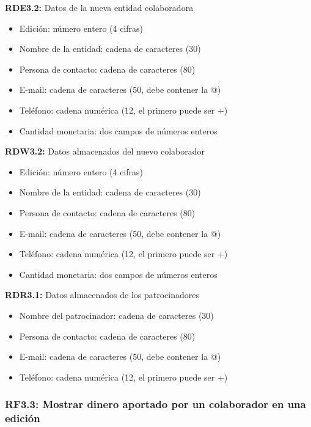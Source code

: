 \textbf{RDE3.2:} Datos de la nueva entidad colaboradora
\begin{itemize}
	\item Edición: número entero (4 cifras)
\newline
	\item Nombre de la entidad: cadena de caracteres (30)
	\item Persona de contacto: cadena de caracteres (80)
	\item E-mail: cadena de caracteres (50, debe contener la @)
	\item Teléfono: cadena numérica (12, el primero puede ser +)
\newline
	\item Cantidad monetaria: dos campos de números enteros
\end{itemize}

\textbf{RDW3.2:} Datos almacenados del nuevo colaborador
\begin{itemize}
	\item Edición: número entero (4 cifras)
\newline
	\item Nombre de la entidad: cadena de caracteres (30)
	\item Persona de contacto: cadena de caracteres (80)
	\item E-mail: cadena de caracteres (50, debe contener la @)
	\item Teléfono: cadena numérica (12, el primero puede ser +)
\newline
	\item Cantidad monetaria: dos campos de números enteros
\end{itemize}

\textbf{RDR3.1:} Datos almacenados de los patrocinadores
\begin{itemize}
	\item Nombre del patrocinador: cadena de caracteres (30)
	\item Persona de contacto: cadena de caracteres (80)
	\item E-mail: cadena de caracteres (50, debe contener la @)
	\item Teléfono: cadena numérica (12, el primero puede ser +)
\end{itemize}

\subsubsection{RF3.3: Mostrar dinero aportado por un colaborador en una edición}

